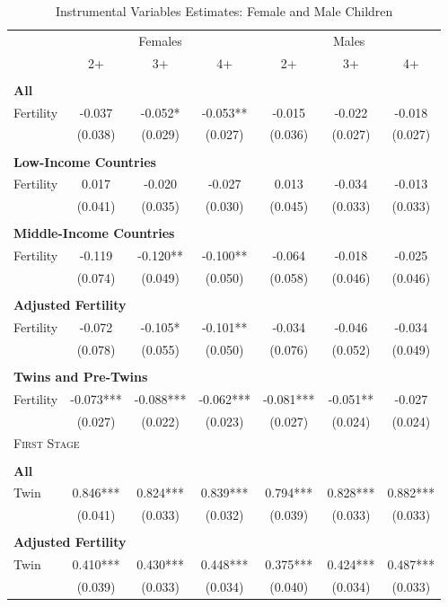 \begin{table}[!htbp] \centering 
\caption{Instrumental Variables Estimates: Female and Male Children} 
\label{TWINtab:IVgend} 
\begin{tabular}{lcccccc} \toprule \toprule 
&\multicolumn{3}{c}{Females}&\multicolumn{3}{c}{Males}\\ 
\cmidrule(r){2-4} \cmidrule(r){5-7} 
&2+&3+&4+&2+&3+&4+ \\ \midrule 
&&&&\\
\multicolumn{7}{l}{\textbf{All}}\\ 
Fertility&-0.037&-0.052*&-0.053**&-0.015&-0.022&-0.018\\
&(0.038)&(0.029)&(0.027)&(0.036)&(0.027)&(0.027)\\
&&&&\\
\multicolumn{7}{l}{\textbf{Low-Income Countries}}\\ 
Fertility&0.017&-0.020&-0.027&0.013&-0.034&-0.013\\
&(0.041)&(0.035)&(0.030)&(0.045)&(0.033)&(0.033)\\
&&&&\\
\multicolumn{7}{l}{\textbf{Middle-Income Countries}}\\ 
Fertility&-0.119&-0.120**&-0.100**&-0.064&-0.018&-0.025\\
&(0.074)&(0.049)&(0.050)&(0.058)&(0.046)&(0.046)\\
&&&&\\
\multicolumn{7}{l}{\textbf{Adjusted Fertility}}\\ 
Fertility&-0.072&-0.105*&-0.101**&-0.034&-0.046&-0.034\\
&(0.078)&(0.055)&(0.050)&(0.076)&(0.052)&(0.049)\\
&&&&\\
\multicolumn{7}{l}{\textbf{Twins and Pre-Twins}}\\ 
Fertility&-0.073***&-0.088***&-0.062***&-0.081***&-0.051**&-0.027\\
&(0.027)&(0.022)&(0.023)&(0.027)&(0.024)&(0.024)\\
\midrule\multicolumn{5}{l}{\textsc{First Stage}}\\ 
&&&&\\
\multicolumn{7}{l}{\textbf{All}}\\ 
Twin&0.846***&0.824***&0.839***&0.794***&0.828***&0.882***\\
&(0.041)&(0.033)&(0.032)&(0.039)&(0.033)&(0.033)\\
&&&&\\
\multicolumn{7}{l}{\textbf{Adjusted Fertility}}\\ 
Twin&0.410***&0.430***&0.448***&0.375***&0.424***&0.487***\\
&(0.039)&(0.033)&(0.034)&(0.040)&(0.034)&(0.033)\\


\end{tabular}
\end{table}
